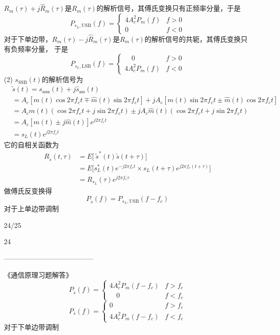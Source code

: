 \documentclass[utf8]{article}
\begin{document}
	$R_m\left(\tau\right)+j\hat{R}_m\left(\tau\right)$是$R_m\left(\tau\right)$的解析信号，其傅氏变换只有正频率分量，于是
	$$P_{s_L,\text{USB}}\left(f\right)=\begin{cases}4A_c^2P_m\left(f\right)&f>0\\0&f<0\end{cases}$$
	对于下单边带，$R_m\left(\tau\right)-j\hat{R}_m\left(\tau\right)$是$R_m\left(\tau\right)$的解析信号的共轭，其傅氏变换只有负频率分量，
	于是
	$$P_{s_L,\mathrm{LSB}}\left(f\right)=\begin{cases}\quad0&f>0\\4A_c^2P_m\left(f\right)&f<0\end{cases}$$
	(2) $s_{\mathrm{SSB}}\left ( t\right )$的解析信号为
	$$\begin{aligned}&\tilde{s}\left(t\right)=s_{\mathrm{ssss}}\left(t\right)+j\hat{s}_{\mathrm{sss}}\left(t\right)\\&=A_{c}\left[m\left(t\right)\cos2\pi f_{c}t\mp\hat{m}\left(t\right)\sin2\pi f_{c}t\right]+jA_{c}\left[m\left(t\right)\sin2\pi f_{c}t\pm\hat{m}\left(t\right)\cos2\pi f_{c}t\right]\\&=A_{c}m\left(t\right)\left(\cos2\pi f_{c}t+j\sin2\pi f_{c}t\right)\pm jA_{c}\hat{m}\left(t\right)\left(\cos2\pi f_{c}t+j\sin2\pi f_{c}t\right)\\&=A_{c}\left[m\left(t\right)\pm j\hat{m}\left(t\right)\right]e^{j2\pi f_{c}t}\\&=s_{L}\left(t\right)e^{j2\pi f_{c}t}\end{aligned}$$
	它的自相关函数为
	$$\begin{aligned}R_{\tilde{s}}\left(t,\tau\right)&=E\bigg[\:\tilde{s}^{*}\left(t\right)\tilde{s}\left(t+\tau\right)\bigg]\\&=E\bigg[s_{L}^{*}\left(t\right)e^{-j2\pi f_{c}t}\times s_{L}\left(t+\tau\right)e^{j2\pi f_{c}\left(t+\tau\right)}\bigg]\\&=R_{s_{L}}\left(\tau\right)e^{j2\pi f_{c}\tau}\end{aligned}$$
	做傅氏反变换得
	$$P_{\tilde{s}}\left(f\right)=P_{s_{L},\mathrm{USB}}\left(f-f_{c}\right)$$
	对于上单边带调制
	
	24/25
	
	24
	
	---------------------------------------
	
	《通信原理习题解答》
	$$P_{\tilde{s}}\left(f\right)=\begin{cases}4A_c^2P_m\left(f-f_c\right)&f>f_c\\\quad0&f<f_c\end{cases}$$
	$$P_{\bar{s}}\left(f\right)=\left\{\begin{matrix}0&f>f_c\\4A_c^2P_m\left(f-f_c\right)&f<f_c\end{matrix}\right.$$
	对于下单边带调制
	
\end{document}

